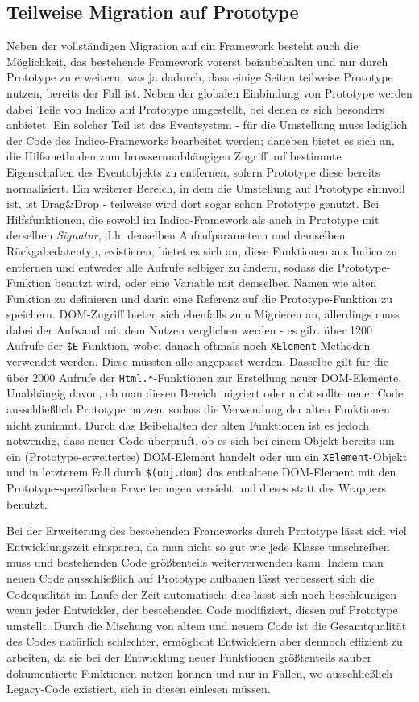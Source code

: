 \subsection{Teilweise Migration auf Prototype}
Neben der vollständigen Migration auf ein Framework besteht auch die Möglichkeit, das bestehende
Framework vorerst beizubehalten und nur durch Prototype zu erweitern, was ja dadurch, dass einige
Seiten teilweise Prototype nutzen, bereits der Fall ist. Neben der globalen Einbindung von Prototype
werden dabei Teile von Indico auf Prototype umgestellt, bei denen es sich besonders anbietet. Ein
solcher Teil ist das Eventsystem - für die Umstellung muss lediglich der Code des Indico-Frameworks
bearbeitet werden; daneben bietet es sich an, die Hilfsmethoden zum browserunabhängigen Zugriff auf
bestimmte Eigenschaften des Eventobjekts zu entfernen, sofern Prototype diese bereits normalisiert.
Ein weiterer Bereich, in dem die Umstellung auf Prototype sinnvoll ist, ist Drag\&Drop - teilweise
wird dort sogar schon Prototype genutzt. Bei Hilfsfunktionen, die sowohl im Indico-Framework als
auch in Prototype mit derselben \emph{Signatur}, d.h. denselben Aufrufparametern und demselben
Rückgabedatentyp, existieren, bietet es sich an, diese Funktionen aus Indico zu entfernen und
entweder alle Aufrufe selbiger zu ändern, sodass die Prototype-Funktion benutzt wird, oder eine
Variable mit demselben Namen wie alten Funktion zu definieren und darin eine Referenz auf die
Prototype-Funktion zu speichern. DOM-Zugriff bieten sich ebenfalls zum Migrieren an, allerdings muss
dabei der Aufwand mit dem Nutzen verglichen werden - es gibt über 1200 Aufrufe der
\lstinline{$E}-Funktion, wobei danach oftmals noch \lstinline{XElement}-Methoden verwendet werden.
Diese müssten alle angepasst werden. Dasselbe gilt für die über 2000 Aufrufe der
\lstinline{Html.*}-Funktionen zur Erstellung neuer DOM-Elemente. Unabhängig davon, ob man diesen
Bereich migriert oder nicht sollte neuer Code ausschließlich Prototype nutzen, sodass die Verwendung
der alten Funktionen nicht zunimmt. Durch das Beibehalten der alten Funktionen ist es jedoch
notwendig, dass neuer Code überprüft, ob es sich bei einem Objekt bereits um ein
(Prototype-erweitertes) DOM-Element handelt oder um ein \lstinline{XElement}-Objekt und in letzterem
Fall durch \lstinline{$(obj.dom)} das enthaltene DOM-Element mit den Prototype-spezifischen
Erweiterungen versieht und dieses statt des Wrappers benutzt.

Bei der Erweiterung des bestehenden Frameworks durch Prototype lässt sich viel Entwicklungszeit
einsparen, da man nicht so gut wie jede Klasse umschreiben muss und bestehenden Code größtenteils
weiterverwenden kann. Indem man neuen Code ausschließlich auf Prototype aufbauen lässt verbessert
sich die Codequalität im Laufe der Zeit automatisch; dies lässt sich noch beschleunigen wenn jeder
Entwickler, der bestehenden Code modifiziert, diesen auf Prototype umstellt. Durch die Mischung von
altem und neuem Code ist die Gesamtqualität des Codes natürlich schlechter, ermöglicht Entwicklern
aber dennoch effizient zu arbeiten, da sie bei der Entwicklung neuer Funktionen größtenteils sauber
dokumentierte Funktionen nutzen können und nur in Fällen, wo ausschließlich Legacy-Code existiert,
sich in diesen einlesen müssen.


